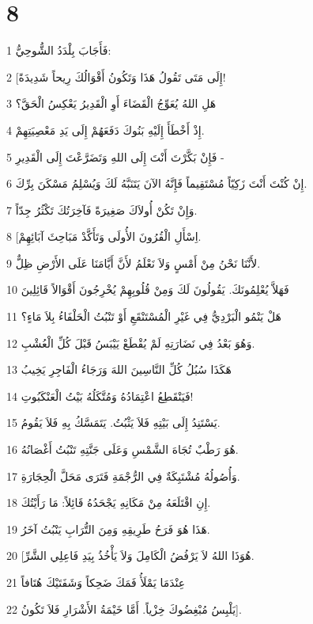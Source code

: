 \chapter{8}

\par 1 فَأَجَابَ بِلْدَدُ الشُّوحِيُّ:
\par 2 [إِلَى مَتَى تَقُولُ هَذَا وَتَكُونُ أَقْوَالُكَ رِيحاً شَدِيدَةً!
\par 3 هَلِ اللهُ يُعَوِّجُ الْقَضَاءَ أَوِ الْقَدِيرُ يَعْكِسُ الْحَقَّ؟
\par 4 إِذْ أَخْطَأَ إِلَيْهِ بَنُوكَ دَفَعَهُمْ إِلَى يَدِ مَعْصِيَتِهِمْ.
\par 5 فَإِنْ بَكَّرْتَ أَنْتَ إِلَى اللهِ وَتَضَرَّعْتَ إِلَى الْقَدِيرِ -
\par 6 إِنْ كُنْتَ أَنْتَ زَكِيّاً مُسْتَقِيماً فَإِنَّهُ الآنَ يَتَنَبَّهُ لَكَ وَيُسْلِمُ مَسْكَنَ بِرِّكَ.
\par 7 وَإِنْ تَكُنْ أُولاَكَ صَغِيرَةً فَآخِرَتُكَ تَكْثُرُ جِدّاً.
\par 8 [اِسْأَلِ الْقُرُونَ الأُولَى وَتَأَكَّدْ مَبَاحِثَ آبَائِهِمْ.
\par 9 لأَنَّنَا نَحْنُ مِنْ أَمْسٍ وَلاَ نَعْلَمُ لأَنَّ أَيَّامَنَا عَلَى الأَرْضِ ظِلٌّ.
\par 10 فَهَلاَّ يُعْلِمُونَكَ. يَقُولُونَ لَكَ وَمِنْ قُلُوبِهِمْ يُخْرِجُونَ أَقْوَالاً قَائِلِينَ
\par 11 هَلْ يَنْمُو الْبَرْدِيُّ فِي غَيْرِ الْمُسْتَنْقَعِ أَوْ تَنْبُتُ الْحَلْفَاءُ بِلاَ مَاءٍ؟
\par 12 وَهُوَ بَعْدُ فِي نَضَارَتِهِ لَمْ يُقْطَعْ يَيْبَسُ قَبْلَ كُلِّ الْعُشْبِ.
\par 13 هَكَذَا سُبُلُ كُلِّ النَّاسِينَ اللهَ وَرَجَاءُ الْفَاجِرِ يَخِيبُ
\par 14 فَيَنْقَطِعُ اعْتِمَادُهُ وَمُتَّكَلُهُ بَيْتُ الْعَنْكَبُوتِ!
\par 15 يَسْتَنِدُ إِلَى بَيْتِهِ فَلاَ يَثْبُتُ. يَتَمَسَّكُ بِهِ فَلاَ يَقُومُ.
\par 16 هُوَ رَطْبٌ تُجَاهَ الشَّمْسِ وَعَلَى جَنَّتِهِ تَنْبُتُ أَغْصَانُهُ.
\par 17 وَأُصُولُهُ مُشْتَبِكَةٌ فِي الرُّجْمَةِ فَتَرَى مَحَلَّ الْحِجَارَةِ.
\par 18 إِنِ اقْتَلَعَهُ مِنْ مَكَانِهِ يَجْحَدُهُ قَائِلاً: مَا رَأَيْتُكَ.
\par 19 هَذَا هُوَ فَرَحُ طَرِيقِهِ وَمِنَ التُّرَابِ يَنْبُتُ آخَرُ.
\par 20 [هُوَذَا اللهُ لاَ يَرْفُضُ الْكَامِلَ وَلاَ يَأْخُذُ بِيَدِ فَاعِلِي الشَّرِّ.
\par 21 عِنْدَمَا يَمْلَأُ فَمَكَ ضَحِكاً وَشَفَتَيْكَ هُتَافاً
\par 22 يَلْبِسُ مُبْغِضُوكَ خِزْياً. أَمَّا خَيْمَةُ الأَشْرَارِ فَلاَ تَكُونُ].

